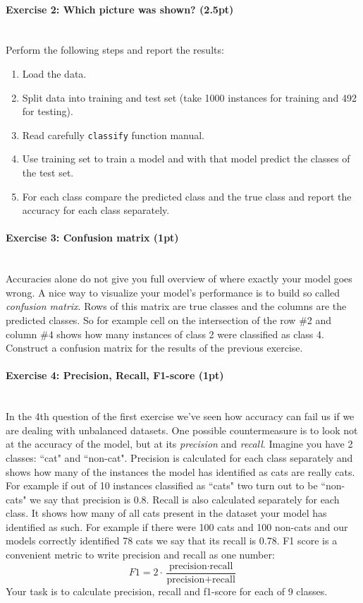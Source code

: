 \documentclass[a4paper,11pt]{article}
\newenvironment{exercise}[3]{\paragraph{Exercise #1: #2 (#3pt)}\ \\}{
\medskip}
\begin{document}
\begin{exercise}{2}{Which picture was shown?}{2.5}
Perform the following steps and report the results:
\begin{enumerate}
	\item Load the data.
	\item Split data into training and test set (take 1000 instances for training and 492 for testing).
	\item Read carefully \texttt{classify} function manual.
	\item Use training set to train a model and with that model predict the classes of the test set.
	\item For each class compare the predicted class and the true class and report the accuracy for each class separately.
\end{enumerate}
\end{exercise}


%
%
\begin{exercise}{3}{Confusion matrix}{1}
Accuracies alone do not give you full overview of where exactly your model goes wrong. A nice way to visualize your model's performance is to build so called \emph{confusion matrix}. Rows of this matrix are true classes and the columns are the predicted classes. So for example cell on the intersection of the row \#2 and column \#4 shows how many instances of class 2 were classified as class 4. Construct a confusion matrix for the results of the previous exercise.
\end{exercise}


%
%
\begin{exercise}{4}{Precision, Recall, F1-score}{1}
In the 4th question of the first exercise we've seen how accuracy can fail us if we are dealing with unbalanced datasets. One possible countermeasure is to look not at the accuracy of the model, but at its \emph{precision} and \emph{recall}. 
Imagine you have 2 classes: ``cat" and ``non-cat". Precision is calculated for each class separately and shows how many of the instances the model has identified as cats are really cats. For example if out of 10 instances classified as ``cats" two turn out to be ``non-cats" we say that precision is 0.8.
Recall is also calculated separately for each class. It shows how many of all cats present in the dataset your model has identified as such. For example if there were 100 cats and 100 non-cats and our models correctly identified 78 cats we say that its recall is 0.78.
F1 score is a convenient metric to write precision and recall as one number:
$$F1 = 2 \cdot \frac{\text{precision} \cdot \text{recall}}{\text{precision} + \text{recall}}$$
Your task is to calculate precision, recall and f1-score for each of 9 classes.
\end{exercise}
\end{document}
